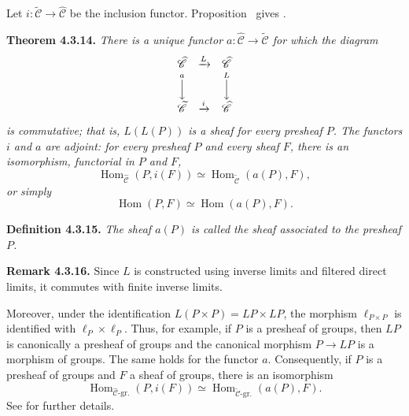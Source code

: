 Let \(i:\widetilde{\mathscr C}\to\widehat{\mathscr C}\) be the inclusion
functor. Proposition~ gives .

\medskip
\noindent{}\textbf{Theorem 4.3.14.}
\textit{There is a unique functor
\(a:\widehat{\mathscr C}\to\widetilde{\mathscr C}\) for which the diagram}
\[
\begin{array}{ccc}
 \widehat{\mathscr C}&\xrightarrow{L}&\widehat{\mathscr C}\\
 \overset{a}{\Big\downarrow}&&
 \overset{L}{\Big\downarrow}\\
 \widetilde{\mathscr C}&\xrightarrow{i}&\widehat{\mathscr C}
\end{array}
\]
\textit{is commutative; that is, \(L(L(P))\) is a sheaf for every
presheaf \(P\). The functors \(i\) and \(a\) are adjoint: for every
presheaf \(P\) and every sheaf \(F\), there is an isomorphism, functorial in
\(P\) and \(F\),}
\[
 \operatorname{Hom}_{\widehat{\mathscr C}}(P,i(F))
 \simeq
 \operatorname{Hom}_{\widetilde{\mathscr C}}(a(P),F),
\]
\textit{or simply}
\[
 \operatorname{Hom}(P,F)\simeq\operatorname{Hom}(a(P),F).
\]

\medskip
\noindent{}\textbf{Definition 4.3.15.}
\textit{The sheaf \(a(P)\) is called the sheaf \emph{associated} to the
presheaf \(P\).}

\medskip
\noindent{}\textbf{Remark 4.3.16.}
Since \(L\) is constructed using inverse limits and filtered direct limits,
it commutes with finite inverse limits.

Moreover, under the identification \(L(P\times P)=LP\times LP\), the
morphism \(\ell_{P\times P}\) is identified with
\(\ell_P\times\ell_P\). Thus, for example, if \(P\) is a presheaf of
groups, then \(LP\) is canonically a presheaf of groups and the canonical
morphism \(P\to LP\) is a morphism of groups. The same holds for the
functor \(a\). Consequently, if \(P\) is a presheaf of groups and \(F\) a
sheaf of groups, there is an isomorphism
\[
 \operatorname{Hom}_{\widehat{\mathscr C}\text{-gr.}}(P,i(F))
 \simeq
 \operatorname{Hom}_{\widetilde{\mathscr C}\text{-gr.}}(a(P),F).
\]
See  for further details.

